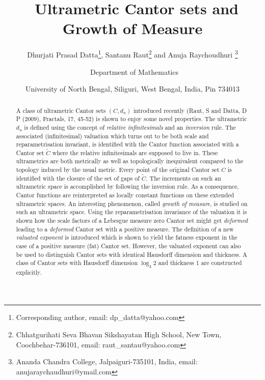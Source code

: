 \documentclass[12pt]{article}
\begin{document}
\title{\textbf{\ Ultrametric Cantor sets and Growth of Measure}}
\author{Dhurjati Prasad Datta\thanks{Corresponding author, email: dp\_datta@yahoo.com}, Santanu Raut\thanks{Chhatgurihati Seva Bhavan Sikshayatan High School, New Town, Coochbehar-736101, email: raut\_santau@yahoo.com} and Anuja Raychoudhuri \thanks{
Ananda Chandra College, Jalpaiguri-735101, India, email: anujaraychaudhuri@ymail.com}\and \ Department of Mathematics \and University of North Bengal,
Siliguri, West Bengal, India, Pin 734013}
\date{}
\maketitle

\baselineskip=17.5pt

\begin{abstract}
A class of ultrametric Cantor sets $(C, d_{u})$ introduced  recently (Raut, S and Datta, D P (2009), Fractals, 17, 45-52) is shown to enjoy some novel properties. The ultrametric $d_{u}$ is defined using the concept of {\em relative infinitesimals} and an {\em inversion } rule. The associated (infinitesimal) valuation  which turns out to be both scale and reparametrisation invariant, is identified with the Cantor function associated with a Cantor set $\tilde C$ where the relative infinitesimals are supposed to live in. These ultrametrics are both metrically as well as topologically inequivalent compared to the topology induced by the usual metric. Every point of the original Cantor set $C$ is identified with the closure of the set of gaps  of $\tilde C$. The increments on such an ultrametric space is accomplished by following the inversion rule. As a consequence, Cantor functions are reinterpreted as locally constant functions on these extended ultrametric spaces. An interesting phenomenon, called {\em growth of measure}, is studied on such an ultrametric space. Using the reparametrisation invariance of the valuation it is shown how the scale factors of a Lebesgue measure zero Cantor set might get {\em deformed} leading to a {\em deformed} Cantor set with a positive measure. The definition of a new {\em valuated exponent} is introduced which is shown to yield the fatness exponent in the case of a positive measure (fat) Cantor set. However, the valuated exponent can also be used to distinguish  Cantor sets with identical Hausdorff dimension and thickness. A class of Cantor sets with Hausdorff dimension $\log_3 2$ and thickness 1 are constructed explicitly.
\end{abstract}
\end{document}
